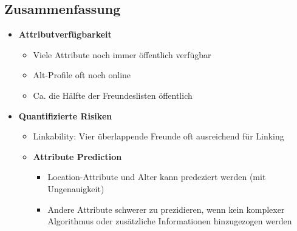 \subsection{Zusammenfassung}
\begin{itemize}
	\item \textbf{Attributverfügbarkeit}
	\begin{itemize}
		\item Viele Attribute noch immer öffentlich verfügbar
		\item Alt-Profile oft noch online
		\item Ca. die Hälfte der Freundeslisten öffentlich
	\end{itemize}
	\item \textbf{Quantifizierte Risiken}
	\begin{itemize}
		\item Linkability: Vier überlappende Freunde oft ausreichend für Linking
		\item \textbf{Attribute Prediction}
		\begin{itemize}
			\item Location-Attribute und Alter kann predeziert werden (mit Ungenauigkeit)
			\item Andere Attribute schwerer zu prezidieren, wenn kein komplexer Algorithmus oder zusätzliche Informationen hinzugezogen werden
		\end{itemize}
	\end{itemize}
\end{itemize}
